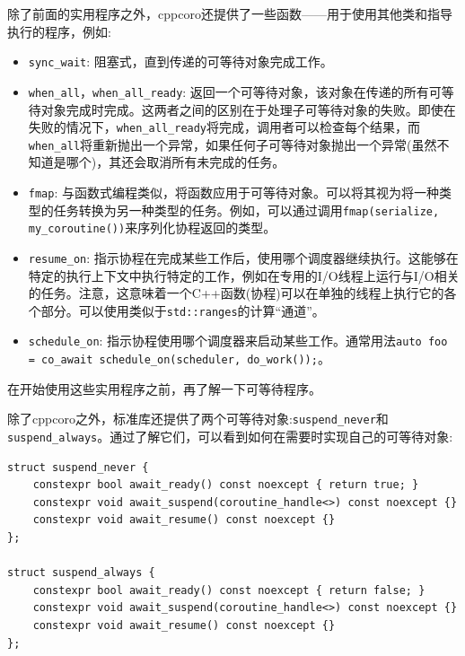 除了前面的实用程序之外，cppcoro还提供了一些函数——用于使用其他类和指导执行的程序，例如:

\begin{itemize}
\item 
\texttt{sync\_wait}: 阻塞式，直到传递的可等待对象完成工作。

\item
\texttt{when\_all}，\texttt{when\_all\_ready}: 返回一个可等待对象，该对象在传递的所有可等待对象完成时完成。这两者之间的区别在于处理子可等待对象的失败。即使在失败的情况下，\texttt{when\_all\_ready}将完成，调用者可以检查每个结果，而\texttt{when\_all}将重新抛出一个异常，如果任何子可等待对象抛出一个异常(虽然不知道是哪个)，其还会取消所有未完成的任务。

\item
\texttt{fmap}: 与函数式编程类似，将函数应用于可等待对象。可以将其视为将一种类型的任务转换为另一种类型的任务。例如，可以通过调用\texttt{fmap(serialize, my\_coroutine())}来序列化协程返回的类型。

\item
\texttt{resume\_on}: 指示协程在完成某些工作后，使用哪个调度器继续执行。这能够在特定的执行上下文中执行特定的工作，例如在专用的I/O线程上运行与I/O相关的任务。注意，这意味着一个C++函数(协程)可以在单独的线程上执行它的各个部分。可以使用类似于\texttt{std::ranges}的计算“通道”。

\item
\texttt{schedule\_on}: 指示协程使用哪个调度器来启动某些工作。通常用法\texttt{auto foo = co\_await schedule\_on(scheduler, do\_work());}。
\end{itemize}

在开始使用这些实用程序之前，再了解一下可等待程序。


除了cppcoro之外，标准库还提供了两个可等待对象:\texttt{suspend\_never}和\texttt{suspend\_always}。通过了解它们，可以看到如何在需要时实现自己的可等待对象:

\begin{lstlisting}[style=styleCXX]
struct suspend_never {
	constexpr bool await_ready() const noexcept { return true; }
	constexpr void await_suspend(coroutine_handle<>) const noexcept {}
	constexpr void await_resume() const noexcept {}
};

struct suspend_always {
	constexpr bool await_ready() const noexcept { return false; }
	constexpr void await_suspend(coroutine_handle<>) const noexcept {}
	constexpr void await_resume() const noexcept {}
};
\end{lstlisting}

